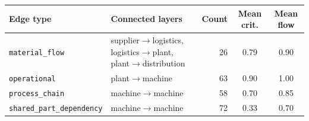 \small
\begin{tabularx}{\textwidth}{l X r c c}
\toprule
\textbf{Edge type} & \textbf{Connected layers} & \textbf{Count} & \textbf{Mean crit.} & \textbf{Mean flow}\\
\midrule
\texttt{material\_flow} & supplier$\to$logistics, logistics$\to$plant, plant$\to$distribution & 26 & 0.79 & 0.90\\
\texttt{operational} & plant$\to$machine & 63 & 0.90 & 1.00\\
\texttt{process\_chain} & machine$\to$machine & 58 & 0.70 & 0.85\\
\texttt{shared\_part\_dependency} & machine$\to$machine & 72 & 0.33 & 0.70\\
\bottomrule
\end{tabularx}
